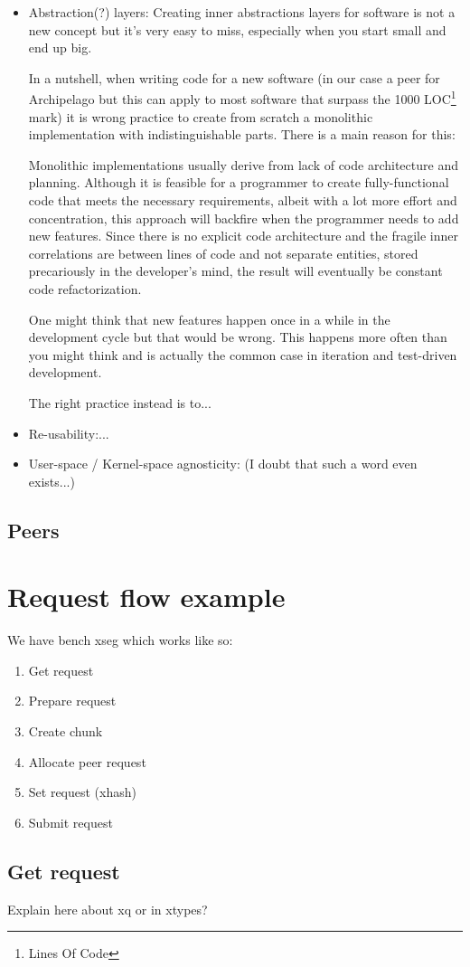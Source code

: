 \begin{itemize}
	\item Abstraction(?) layers: Creating inner abstractions layers for 
		software is not a new concept but it's very easy to miss, 
		especially when you start small and end up big.
		
		In a nutshell, when writing code for a new software (in our case 
		a peer for Archipelago but this can apply to most software that 
		surpass the 1000 LOC\footnote[1]
		{Lines Of Code}
		mark) it is wrong practice to create from scratch a monolithic 
		implementation with indistinguishable parts. There is a main 
		reason for this:
		
		Monolithic implementations usually derive from lack of code 
		architecture and planning. Although it is feasible for a 
		programmer to create fully-functional code that meets the 
		necessary requirements, albeit with a lot more effort and 
		concentration, this approach will backfire when the programmer 
		needs to add new features. Since there is no explicit code 
		architecture and the fragile inner correlations are between 
		lines of code and not separate entities, stored precariously in 
		the developer's mind, the result will eventually be constant 
		code refactorization.
		
		One might think that new features happen once in a while in the 
		development cycle but that would be wrong.  This happens more 
		often than you might think and is actually the common case in 
		iteration and test-driven development.

		The right practice instead is to...
	\item Re-usability:...
	\item User-space / Kernel-space agnosticity: (I doubt that such a word 
		even exists...)
\end{itemize}	

\subsection{Peers}

\section{Request flow example}

We have bench xseg which works like so:

\begin{enumerate}
	\item Get request
	\item Prepare request
	\item Create chunk
	\item Allocate peer request
	\item Set request (xhash)
	\item Submit request
\end{enumerate}

\subsection{Get request}\label{sec:get-req-archip}

Explain here about xq or in xtypes?
